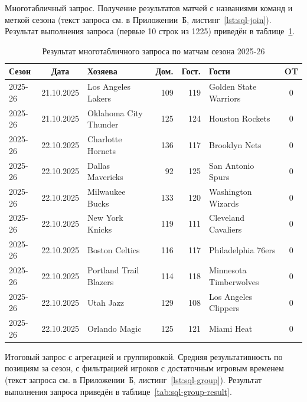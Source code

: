 Многотабличный запрос. Получение результатов матчей с названиями
команд и меткой сезона (текст запроса см. в Приложении~Б,
листинг~\ref{lst:sql-join}).
Результат выполнения запроса (первые 10 строк из 1225) приведён
в таблице~\ref{tab:sql-join-result}.

{\footnotesize\setlength{\tabcolsep}{3pt}\renewcommand{\arraystretch}{1.12}
\begin{table}[H]
\caption{Результат многотабличного запроса по матчам сезона 2025-26}
\label{tab:sql-join-result}
\centering
\begin{tabular}{|l|c|l|r|r|l|c|}
\hline
\textbf{Сезон} & \textbf{Дата} & \textbf{Хозяева} & \textbf{Дом.} & \textbf{Гост.} & \textbf{Гости} & \textbf{OT} \\
\hline
2025-26 & 21.10.2025 & Los Angeles Lakers     & 109 & 119 & Golden State Warriors    & 0 \\
2025-26 & 21.10.2025 & Oklahoma City Thunder  & 125 & 124 & Houston Rockets          & 0 \\
2025-26 & 22.10.2025 & Charlotte Hornets      & 136 & 117 & Brooklyn Nets            & 0 \\
2025-26 & 22.10.2025 & Dallas Mavericks       &  92 & 125 & San Antonio Spurs        & 0 \\
2025-26 & 22.10.2025 & Milwaukee Bucks        & 133 & 120 & Washington Wizards       & 0 \\
2025-26 & 22.10.2025 & New York Knicks        & 119 & 111 & Cleveland Cavaliers      & 0 \\
2025-26 & 22.10.2025 & Boston Celtics         & 116 & 117 & Philadelphia 76ers       & 0 \\
2025-26 & 22.10.2025 & Portland Trail Blazers & 114 & 118 & Minnesota Timberwolves   & 0 \\
2025-26 & 22.10.2025 & Utah Jazz              & 129 & 108 & Los Angeles Clippers     & 0 \\
2025-26 & 22.10.2025 & Orlando Magic          & 125 & 121 & Miami Heat               & 0 \\
\hline
\end{tabular}
\end{table}}

Итоговый запрос с агрегацией и группировкой. Средняя
результативность по позициям за сезон, с фильтрацией игроков
с достаточным игровым временем (текст запроса см. в Приложении~Б,
листинг~\ref{lst:sql-group}).
Результат выполнения запроса приведён в таблице~\ref{tab:sql-group-result}.

